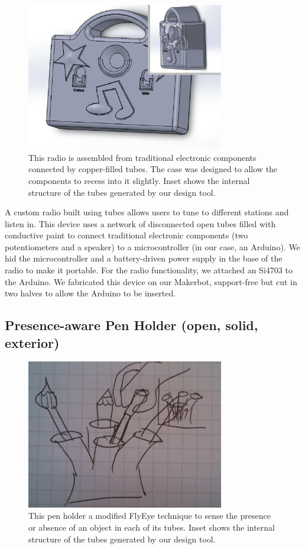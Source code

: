 \begin{figure}[h]
\centering
    \includegraphics[width=3.4in]{figures/radio.png}
\caption{This radio is assembled from traditional electronic components connected by copper-filled tubes.  The case was designed to allow the components to recess into it slightly.  Inset shows the internal structure of the tubes generated by our design tool.}
\label{fig:radio}
\end{figure}

A custom radio built using tubes allows users to tune to different stations and listen in.  This device uses a network of disconnected open tubes filled with conductive paint to connect traditional electronic components (two potentiometers and a speaker) to a microcontroller (in our case, an Arduino).  We hid the microcontroller and a battery-driven power supply in the base of the radio to make it portable.  For the radio functionality, we attached an Si4703 to the Arduino.  We fabricated this device on our Makerbot, support-free but cut in two halves to allow the Arduino to be inserted.

\subsection{Presence-aware Pen Holder (open, solid, exterior)}

\begin{figure}[h]
\centering
    \includegraphics[width=3.4in]{figures/placeholder/pens.jpg}
\caption{This pen holder a modified FlyEye technique to sense the presence or absence of an object in each of its tubes.  Inset shows the internal structure of the tubes generated by our design tool.}
\label{fig:pens}
\end{figure}

